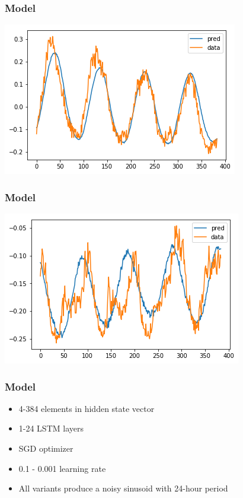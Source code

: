 \documentclass{beamer}
\begin{document}
\begin{frame}
  \frametitle{Model}
  \includegraphics[width=\textwidth]{okfit.png}
\end{frame}

\begin{frame}
  \frametitle{Model}
  \includegraphics[width=\textwidth]{badfit.png}
\end{frame}

\begin{frame}
  \frametitle{Model}
  \begin{itemize}
    \item 4-384 elements in hidden state vector
    \item 1-24 LSTM layers
    \item SGD optimizer
    \item 0.1 - 0.001 learning rate
    \item All variants produce a noisy sinusoid with 24-hour period
  \end{itemize}
\end{frame}
\end{document}
